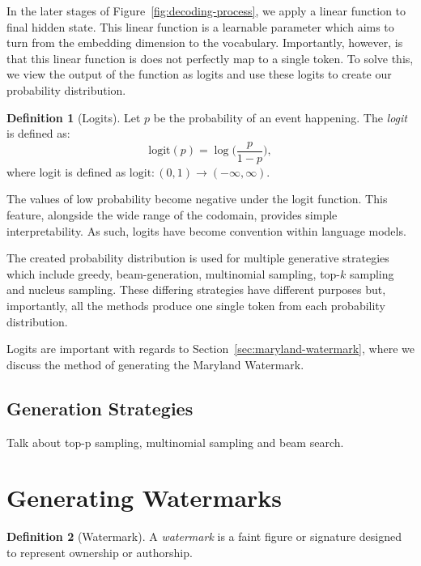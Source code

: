 \documentclass{l4proj}
\theoremstyle{definition}
\newtheorem{definition}{Definition}[section]
\begin{document}
        In the later stages of Figure~\ref{fig:decoding-process}, we apply a linear function to final hidden state. This linear function is a learnable parameter which aims to turn from the embedding dimension to the vocabulary. Importantly, however, is that this linear function is does not perfectly map to a single token. To solve this, we view the output of the function as logits and use these logits to create our probability distribution.
    
        \begin{definition}[Logits]
            Let $p$ be the probability of an event happening. The \emph{logit} is defined as: 
            \begin{equation*}
                \text{logit}(p) = \log\bigg(\frac{p}{1-p}\bigg),
            \end{equation*}
            where logit is defined as $\text{logit}: (0,1) \rightarrow (-\infty, \infty)$.
        \end{definition}
        
        The values of low probability become negative under the logit function. This feature, alongside the wide range of the codomain, provides simple interpretability. As such, logits have become convention within language models.

        The created probability distribution is used for multiple generative strategies which include greedy, beam-generation, multinomial sampling, top-$k$ sampling and nucleus sampling. These differing strategies have different purposes but, importantly, all the methods produce one single token from each probability distribution.

        Logits are important with regards to Section~\ref{sec:maryland-watermark}, where we discuss the method of generating the Maryland Watermark.

    \subsection{Generation Strategies}
        Talk about top-p sampling, multinomial sampling and beam search. 
    
\section{Generating Watermarks}
    \begin{definition}[Watermark]
        A \emph{watermark} is a faint figure or signature designed to represent ownership or authorship.
    \end{definition}
\end{document}
